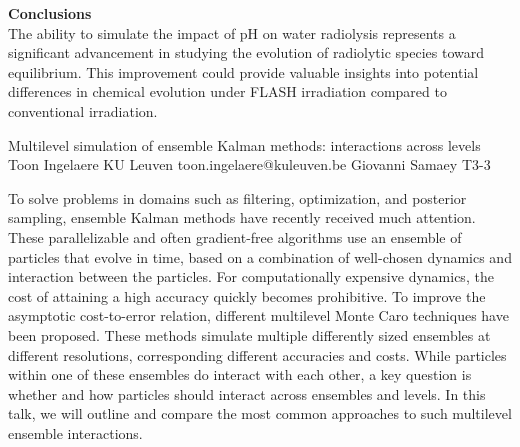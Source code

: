 \begin{talk}
\textbf{Conclusions}\\
The ability to simulate the impact of pH on water radiolysis represents a significant advancement in studying the evolution of radiolytic species toward equilibrium. This improvement could provide valuable insights into potential differences in chemical evolution under FLASH irradiation compared to conventional irradiation.


\medskip



\end{talk}

\begin{talk}
  {Multilevel simulation of ensemble Kalman methods: interactions across levels}%
  {Toon Ingelaere}%
  {KU Leuven}%
  {toon.ingelaere@kuleuven.be}%
  {Giovanni Samaey}%
  {T3-3}%

        To solve problems in domains such as filtering, optimization, and posterior sampling,
        ensemble Kalman methods have recently received much attention. These parallelizable and often gradient-free algorithms use an ensemble of particles that evolve in time, based on a combination of well-chosen dynamics and interaction between the particles. For computationally expensive dynamics, the cost of attaining a high accuracy quickly becomes prohibitive. To improve the asymptotic cost-to-error relation, different multilevel Monte Caro techniques have been proposed. These methods simulate multiple differently sized ensembles at different resolutions, corresponding different accuracies and costs. While particles within one of these ensembles do interact with each other, a key question is whether and how particles should interact across ensembles and levels.
        In this talk, we will outline and compare the most common approaches to such multilevel ensemble interactions.

\medskip

\end{talk}

